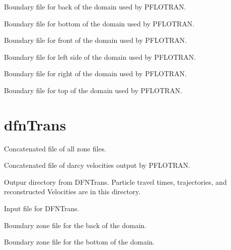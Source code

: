 \documentclass[letterpaper,10pt,english]{sphinxmanual}
\begin{document}
\label{\detokenize{output:pboundary-back-n-ex}}
Boundary file for back of the domain used by PFLOTRAN.

\label{\detokenize{output:pboundary-bottom-ex}}
Boundary file for bottom of the domain used by PFLOTRAN.

\label{\detokenize{output:pboundary-front-s-ex}}
Boundary file for front of the domain used by PFLOTRAN.

\label{\detokenize{output:pboundary-left-w-ex}}
Boundary file for left side of the domain used by PFLOTRAN.

\label{\detokenize{output:pboundary-right-e-ex}}
Boundary file for right of the domain used by PFLOTRAN.

\label{\detokenize{output:pboundary-top-ex}}
Boundary file for top of the domain used by PFLOTRAN.


\section{dfnTrans}
\label{\detokenize{output:dfntrans}}
\label{\detokenize{output:allboundaries-zone}}
Concatenated file of all zone files.

\label{\detokenize{output:darcyvel-dat}}
Concatenated file of darcy velocities output by PFLOTRAN.

\label{\detokenize{output:dfntrans-output-dir}}
Outpur directory from DFNTrans. Particle travel times, trajectories, and reconstructed Velocities are in this directory.

\label{\detokenize{output:ptdfn-control-dat}}
Input file for DFNTrans.

\label{\detokenize{output:pboundary-back-n-zone}}
Boundary zone file for the back of the domain.

\label{\detokenize{output:pboundary-bottom-zone}}
Boundary zone file for the bottom of the domain.
\end{document}

